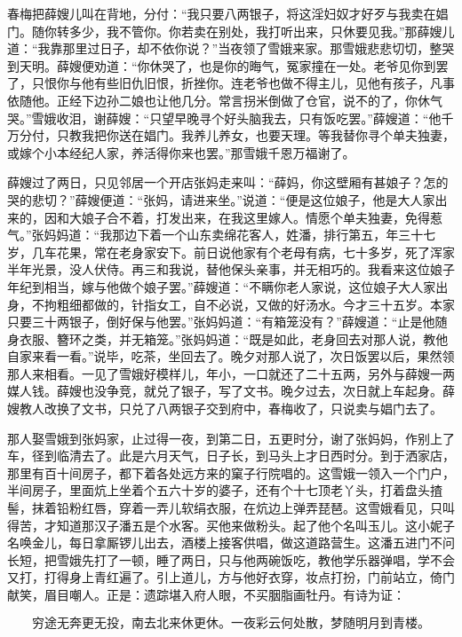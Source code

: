 春梅把薛嫂儿叫在背地，分付：“我只要八两银子，将这淫妇奴才好歹与我卖在娼门。随你转多少，我不管你。你若卖在别处，我打听出来，只休要见我。”那薛嫂儿道：“我靠那里过日子，却不依你说？”当夜领了雪娥来家。那雪娥悲悲切切，整哭到天明。薛嫂便劝道：“你休哭了，也是你的晦气，冤家撞在一处。老爷见你到罢了，只恨你与他有些旧仇旧恨，折挫你。连老爷也做不得主儿，见他有孩子，凡事依随他。正经下边孙二娘也让他几分。常言拐米倒做了仓官，说不的了，你休气哭。”雪娥收泪，谢薛嫂：“只望早晚寻个好头脑我去，只有饭吃罢。”薛嫂道：“他千万分付，只教我把你送在娼门。我养儿养女，也要天理。等我替你寻个单夫独妻，或嫁个小本经纪人家，养活得你来也罢。”那雪娥千恩万福谢了。

薛嫂过了两日，只见邻居一个开店张妈走来叫：“薛妈，你这壁厢有甚娘子？怎的哭的悲切？”薛嫂便道：“张妈，请进来坐。”说道：“便是这位娘子，他是大人家出来的，因和大娘子合不着，打发出来，在我这里嫁人。情愿个单夫独妻，免得惹气。”张妈妈道：“我那边下着一个山东卖绵花客人，姓潘，排行第五，年三十七岁，几车花果，常在老身家安下。前日说他家有个老母有病，七十多岁，死了浑家半年光景，没人伏侍。再三和我说，替他保头亲事，并无相巧的。我看来这位娘子年纪到相当，嫁与他做个娘子罢。”薛嫂道：“不瞒你老人家说，这位娘子大人家出身，不拘粗细都做的，针指女工，自不必说，又做的好汤水。今才三十五岁。本家只要三十两银子，倒好保与他罢。”张妈妈道：“有箱笼没有？”薛嫂道：“止是他随身衣服、簪环之类，并无箱笼。”张妈妈道：“既是如此，老身回去对那人说，教他自家来看一看。”说毕，吃茶，坐回去了。晚夕对那人说了，次日饭罢以后，果然领那人来相看。一见了雪娥好模样儿，年小，一口就还了二十五两，另外与薛嫂一两媒人钱。薛嫂也没争竞，就兑了银子，写了文书。晚夕过去，次日就上车起身。薛嫂教人改换了文书，只兑了八两银子交到府中，春梅收了，只说卖与娼门去了。

那人娶雪娥到张妈家，止过得一夜，到第二日，五更时分，谢了张妈妈，作别上了车，径到临清去了。此是六月天气，日子长，到马头上才日西时分。到于洒家店，那里有百十间房子，都下着各处远方来的窠子行院唱的。这雪娥一领入一个门户，半间房子，里面炕上坐着个五六十岁的婆子，还有个十七顶老丫头，打着盘头揸髻，抹着铅粉红唇，穿着一弄儿软绢衣服，在炕边上弹弄琵琶。这雪娥看见，只叫得苦，才知道那汉子潘五是个水客。买他来做粉头。起了他个名叫玉儿。这小妮子名唤金儿，每日拿厮锣儿出去，酒楼上接客供唱，做这道路营生。这潘五进门不问长短，把雪娥先打了一顿，睡了两日，只与他两碗饭吃，教他学乐器弹唱，学不会又打，打得身上青红遍了。引上道儿，方与他好衣穿，妆点打扮，门前站立，倚门献笑，眉目嘲人。正是：遗踪堪入府人眼，不买胭脂画牡丹。有诗为证：

\[
穷途无奔更无投，南去北来休更休。
一夜彩云何处散，梦随明月到青楼。
\]


